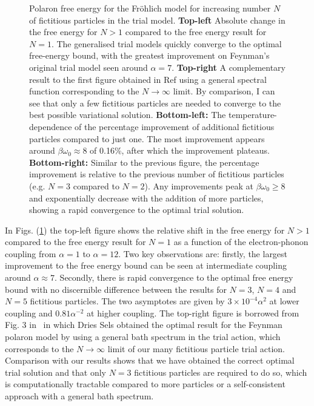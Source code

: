 \begin{figure}[!tbp]
  \caption{Polaron free energy for the Fr\"ohlich model for increasing number $N$ of fictitious particles in the trial model. \textbf{Top-left} Absolute change in the free energy for $N>1$ compared to the free energy result for $N=1$. The generalised trial models quickly converge to the optimal free-energy bound, with the greatest improvement on Feynman's original trial model seen around $\alpha = 7$. \textbf{Top-right} A complementary result to the first figure obtained in Ref{} using a general spectral function corresponding to the $N\to\infty$ limit. By comparison, I can see that only a few fictitious particles are needed to converge to the best possible variational solution. \textbf{Bottom-left:} The temperature-dependence of the percentage improvement of additional fictitious particles compared to just one. The most improvement appears around $\beta\omega_0 \approx 8$ of 0.16\%, after which the improvement plateaus. \textbf{Bottom-right:} Similar to the previous figure, the percentage improvement is relative to the previous number of fictitious particles (e.g. $N=3$ compared to $N=2$). Any improvements peak at $\beta\omega_0 \geq 8$ and exponentially decrease with the addition of more particles, showing a rapid convergence to the optimal trial solution.}
  \label{fig:multienergy}
\end{figure}

In Figs. (\ref{fig:multienergy}) the top-left figure shows the relative shift in the free energy for $N>1$ compared to the free energy result for $N=1$ as a function of the electron-phonon coupling from $\alpha=1$ to $\alpha=12$. Two key observations are: firstly, the largest improvement to the free energy bound can be seen at intermediate coupling around $\alpha \approx 7$. Secondly, there is rapid convergence to the optimal free energy bound with no discernible difference between the results for $N=3$, $N=4$ and $N=5$ fictitious particles. The two asymptotes are given by $3 \times 10^{-4} \alpha^2$ at lower coupling and $0.81 \alpha^{-2}$ at higher coupling. The top-right figure is borrowed from Fig. 3 in~\cite{sels_dynamic_2016} in which Dries Sels obtained the optimal result for the Feynman polaron model by using a general bath spectrum in the trial action, which corresponds to the $N\to\infty$ limit of our many fictitious particle trial action. Comparison with our results shows that we have obtained the correct optimal trial solution and that only $N=3$ fictitious particles are required to do so, which is computationally tractable compared to more particles or a self-consistent approach with a general bath spectrum.

